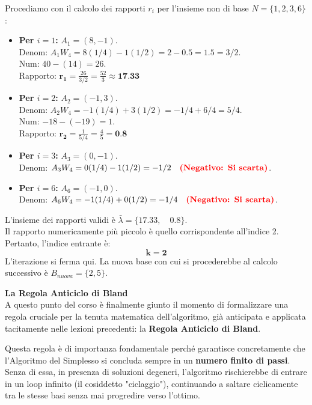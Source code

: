 \documentclass[12pt, a4paper]{article}
\begin{document}
	Procediamo con il calcolo dei rapporti $r_i$ per l'insieme non di base $N = \{1, 2, 3, 6\}$:
	\begin{itemize}[label=$\circ$, itemsep=4pt, leftmargin=1.5cm]
		\item \textbf{Per $i=1$:} $A_1 = (8, -1)$.\\
		Denom: $A_1 W_4 = 8(1/4) - 1(1/2) = 2 - 0.5 = 1.5 = 3/2$.\\
		Num: $40 - (14) = 26$.\\
		Rapporto: $\mathbf{r_1} = \frac{26}{3/2} = \frac{52}{3} \approx \textbf{17.33}$
		
		\item \textbf{Per $i=2$:} $A_2 = (-1, 3)$.\\
		Denom: $A_2 W_4 = -1(1/4) + 3(1/2) = -1/4 + 6/4 = 5/4$.\\
		Num: $-18 - (-19) = 1$.\\
		Rapporto: $\mathbf{r_2} = \frac{1}{5/4} = \frac{4}{5} = \textbf{0.8}$
		
		\item \textbf{Per $i=3$:} $A_3 = (0, -1)$.\\
		Denom: $A_3 W_4 = 0(1/4) - 1(1/2) = -1/2 \quad \text{\textcolor{red}{\textbf{(Negativo: Si scarta)}}}$.
		
		\item \textbf{Per $i=6$:} $A_6 = (-1, 0)$.\\
		Denom: $A_6 W_4 = -1(1/4) + 0(1/2) = -1/4 \quad \text{\textcolor{red}{\textbf{(Negativo: Si scarta)}}}$.
	\end{itemize}
	
	L'insieme dei rapporti validi è $\bar{\lambda} = \{17.33, \quad 0.8\}$. \\
	Il rapporto numericamente più piccolo è quello corrispondente all'indice 2. Pertanto, l'indice entrante è:
	\[
	\mathbf{k = 2}
	\]
	L'iterazione si ferma qui. La nuova base con cui si procederebbe al calcolo successivo è $B_{nuova} = \{2, 5\}$.
	
	\vspace{0.6cm}
	\textbf{La Regola Anticiclo di Bland}\\
	A questo punto del corso è finalmente giunto il momento di formalizzare una regola cruciale per la tenuta matematica dell'algoritmo, già anticipata e applicata tacitamente nelle lezioni precedenti: la \textbf{Regola Anticiclo di Bland}.
	
	Questa regola è di importanza fondamentale perché garantisce concretamente che l'Algoritmo del Simplesso si concluda sempre in un \textbf{numero finito di passi}. Senza di essa, in presenza di soluzioni degeneri, l'algoritmo rischierebbe di entrare in un loop infinito (il cosiddetto "ciclaggio"), continuando a saltare ciclicamente tra le stesse basi senza mai progredire verso l'ottimo.
	
\end{document}
